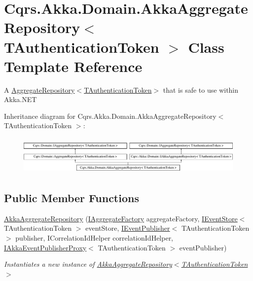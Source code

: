 \hypertarget{classCqrs_1_1Akka_1_1Domain_1_1AkkaAggregateRepository}{}\section{Cqrs.\+Akka.\+Domain.\+Akka\+Aggregate\+Repository$<$ T\+Authentication\+Token $>$ Class Template Reference}
\label{classCqrs_1_1Akka_1_1Domain_1_1AkkaAggregateRepository}


A \hyperlink{classCqrs_1_1Domain_1_1AggregateRepository_ae4a6c96b10c536a0df6a381659f87744_ae4a6c96b10c536a0df6a381659f87744}{Aggregate\+Repository$<$\+T\+Authentication\+Token$>$} that is safe to use within Akka.\+N\+ET  


Inheritance diagram for Cqrs.\+Akka.\+Domain.\+Akka\+Aggregate\+Repository$<$ T\+Authentication\+Token $>$\+:\begin{figure}[H]
\begin{center}
\leavevmode
\includegraphics[height=1.958042cm]{classCqrs_1_1Akka_1_1Domain_1_1AkkaAggregateRepository}
\end{center}
\end{figure}
\subsection*{Public Member Functions}
\begin{DoxyCompactItemize}
\item 
\hyperlink{classCqrs_1_1Akka_1_1Domain_1_1AkkaAggregateRepository_afc997ba5187ca08d3f81a0c204eda3a2_afc997ba5187ca08d3f81a0c204eda3a2}{Akka\+Aggregate\+Repository} (\hyperlink{interfaceCqrs_1_1Domain_1_1Factories_1_1IAggregateFactory}{I\+Aggregate\+Factory} aggregate\+Factory, \hyperlink{interfaceCqrs_1_1Events_1_1IEventStore}{I\+Event\+Store}$<$ T\+Authentication\+Token $>$ event\+Store, \hyperlink{interfaceCqrs_1_1Events_1_1IEventPublisher}{I\+Event\+Publisher}$<$ T\+Authentication\+Token $>$ publisher, I\+Correlation\+Id\+Helper correlation\+Id\+Helper, \hyperlink{interfaceCqrs_1_1Akka_1_1Events_1_1IAkkaEventPublisherProxy}{I\+Akka\+Event\+Publisher\+Proxy}$<$ T\+Authentication\+Token $>$ event\+Publisher)
\begin{DoxyCompactList}\small\item\em Instantiates a new instance of \hyperlink{classCqrs_1_1Akka_1_1Domain_1_1AkkaAggregateRepository_afc997ba5187ca08d3f81a0c204eda3a2_afc997ba5187ca08d3f81a0c204eda3a2}{Akka\+Aggregate\+Repository$<$\+T\+Authentication\+Token$>$} \end{DoxyCompactList}\end{DoxyCompactItemize}
